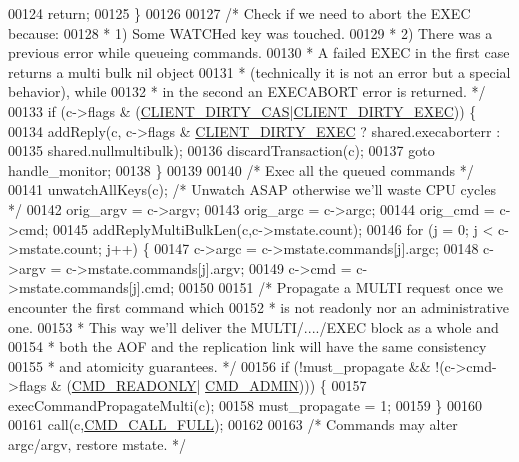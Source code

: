 \begin{DoxyCode}
00124         \textcolor{keywordflow}{return};
00125     \}
00126 
00127     \textcolor{comment}{/* Check if we need to abort the EXEC because:}
00128 \textcolor{comment}{     * 1) Some WATCHed key was touched.}
00129 \textcolor{comment}{     * 2) There was a previous error while queueing commands.}
00130 \textcolor{comment}{     * A failed EXEC in the first case returns a multi bulk nil object}
00131 \textcolor{comment}{     * (technically it is not an error but a special behavior), while}
00132 \textcolor{comment}{     * in the second an EXECABORT error is returned. */}
00133     \textcolor{keywordflow}{if} (c->flags & (\hyperlink{server_8h_a0f4df645d72b6b3e9a0d07afbe502a51}{CLIENT\_DIRTY\_CAS}|\hyperlink{server_8h_a7c203dc3aba692e212393d08530bdb97}{CLIENT\_DIRTY\_EXEC})) \{
00134         addReply(c, c->flags & \hyperlink{server_8h_a7c203dc3aba692e212393d08530bdb97}{CLIENT\_DIRTY\_EXEC} ? shared.execaborterr :
00135                                                   shared.nullmultibulk);
00136         discardTransaction(c);
00137         \textcolor{keywordflow}{goto} handle\_monitor;
00138     \}
00139 
00140     \textcolor{comment}{/* Exec all the queued commands */}
00141     unwatchAllKeys(c); \textcolor{comment}{/* Unwatch ASAP otherwise we'll waste CPU cycles */}
00142     orig\_argv = c->argv;
00143     orig\_argc = c->argc;
00144     orig\_cmd = c->cmd;
00145     addReplyMultiBulkLen(c,c->mstate.count);
00146     \textcolor{keywordflow}{for} (j = 0; j < c->mstate.count; j++) \{
00147         c->argc = c->mstate.commands[j].argc;
00148         c->argv = c->mstate.commands[j].argv;
00149         c->cmd = c->mstate.commands[j].cmd;
00150 
00151         \textcolor{comment}{/* Propagate a MULTI request once we encounter the first command which}
00152 \textcolor{comment}{         * is not readonly nor an administrative one.}
00153 \textcolor{comment}{         * This way we'll deliver the MULTI/..../EXEC block as a whole and}
00154 \textcolor{comment}{         * both the AOF and the replication link will have the same consistency}
00155 \textcolor{comment}{         * and atomicity guarantees. */}
00156         \textcolor{keywordflow}{if} (!must\_propagate && !(c->cmd->flags & (\hyperlink{server_8h_a7e9c728f228e1c82ae1e22173375abcf}{CMD\_READONLY}|
      \hyperlink{server_8h_a1917805ea3942a4784ec806c33bc6033}{CMD\_ADMIN}))) \{
00157             execCommandPropagateMulti(c);
00158             must\_propagate = 1;
00159         \}
00160 
00161         call(c,\hyperlink{server_8h_a7e92e38a9fe5f713cace24d63184273e}{CMD\_CALL\_FULL});
00162 
00163         \textcolor{comment}{/* Commands may alter argc/argv, restore mstate. */}

\end{DoxyCode}
